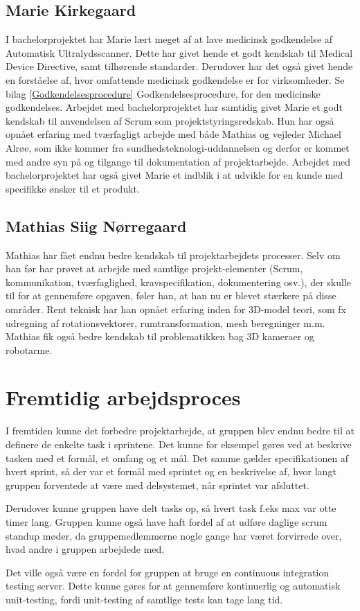 \subsection{Marie Kirkegaard}
I bachelorprojektet har Marie lært meget af at lave medicinsk godkendelse af Automatisk Ultralydsscanner. Dette har givet hende et godt kendskab til Medical Device Directive, samt tilhørende standarder. Derudover har det også givet hende en forståelse af, hvor omfattende medicinsk godkendelse er for virksomheder. Se bilag \ref{Godkendelsesprocedure} Godkendelsesprocedure, for den medicinske godkendelses. Arbejdet med bachelorprojektet har samtidig givet Marie et godt kendskab til anvendelsen af Scrum som projektstyringsredskab. Hun har også opnået erfaring med tværfagligt arbejde med både Mathias og vejleder Michael Alrøe, som ikke kommer fra sundhedsteknologi-uddannelsen og derfor er kommet med andre syn på og tilgange til dokumentation af projektarbejde. Arbejdet med bachelorprojektet har også givet Marie et indblik i at udvikle for en kunde med specifikke ønsker til et produkt. 

\subsection{Mathias Siig Nørregaard}
Mathias har fået endnu bedre kendskab til projektarbejdets processer. Selv om han før har prøvet at arbejde med samtlige projekt-elementer (Scrum, kommunikation, tværfaglighed, kravspecifikation, dokumentering osv.), der skulle til for at gennemføre opgaven, føler han, at han nu er blevet stærkere på disse områder. Rent teknisk har han opnået erfaring inden for 3D-model teori, som fx udregning af rotationsvektorer, rumtransformation, mesh beregninger m.m. Mathias fik også bedre kendskab til problematikken bag 3D kameraer og robotarme.

\section{Fremtidig arbejdsproces}
I fremtiden kunne det forbedre projektarbejde, at gruppen blev endnu bedre til at definere de enkelte task i sprintene. Det kunne for eksempel gøres ved at beskrive tasken med et formål, et omfang og et mål. Det samme gælder specifikationen af hvert sprint, så der var et formål med sprintet og en beskrivelse af, hvor langt gruppen forventede at være med delsystemet, når sprintet var afsluttet.

Derudover kunne gruppen have delt tasks op, så hvert task f.eks max var otte timer lang. Gruppen kunne også have haft fordel af at udføre daglige scrum standup møder, da gruppemedlemmerne nogle gange har været forvirrede over, hvad andre i gruppen arbejdede med.

Det ville også være en fordel for gruppen at bruge en continuous integration testing server. Dette kunne gøres for at gennemføre kontinuerlig og automatisk unit-testing, fordi unit-testing af samtlige tests kan tage lang tid.